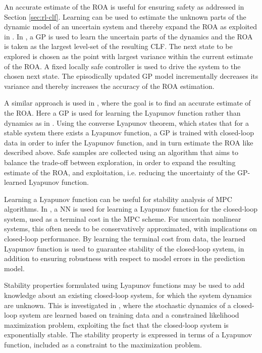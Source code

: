 \documentclass[3p,times,procedia]{elsarticle}
\begin{document}
An accurate estimate of the ROA is useful for ensuring safety as addressed in Section \ref{sec:rl-clf}. Learning can be used to estimate the unknown parts of the dynamic model of an uncertain system and thereby expand the ROA as exploited in \cite{Berkenkamp2016}. In \cite{Berkenkamp2016}, a GP is used to learn the uncertain parts of the dynamics and the ROA is taken as the largest level-set of the resulting CLF. The next state to be explored is chosen as the point with largest variance within the current estimate of the ROA. A fixed locally safe controller is used to drive the system to the chosen next state. The episodically updated GP model incrementally decreases its variance and thereby increases the accuracy of the ROA estimation.


A similar approach is used in \cite{Zhai2019}, where the goal is to find an accurate estimate of the ROA. Here a GP is used for learning the Lyapunov function rather than dynamics as in \cite{Berkenkamp2016}. Using the converse Lyapunov theorem, which states that for a stable system there exists a Lyapunov function, a GP is trained with closed-loop data in order to infer the Lyapunov function, and in turn estimate the ROA like described above. Safe samples are collected using an algorithm that aims to balance the trade-off between exploration, in order to expand the resulting estimate of the ROA, and exploitation, i.e. reducing the uncertainty of the GP-learned Lyapunov function. 

Learning a Lyapunov function can be useful for stability analysis of MPC algorithms. In \cite{Mittal2020}, a NN is used for learning a Lyapunov function for the closed-loop system, used as a terminal cost in the MPC scheme. For uncertain nonlinear systems, this often needs to be conservatively approximated, with implications on closed-loop performance. By learning the terminal cost from data, the learned Lyapunov function is used to guarantee stability of the closed-loop system, in addition to ensuring robustness with respect to model errors in the prediction model. 

Stability properties formulated using Lyapunov functions may be used to add knowledge about an existing closed-loop system, for which the system dynamics are unknown. This is investigated in \cite{Umlauft2017}, where the stochastic dynamics of a closed-loop system are learned based on training data and a constrained likelihood maximization problem, exploiting the fact that the closed-loop system is exponentially stable. The stability property is expressed in terms of a Lyapunov function, included as a constraint to the maximization problem. 
\end{document}
